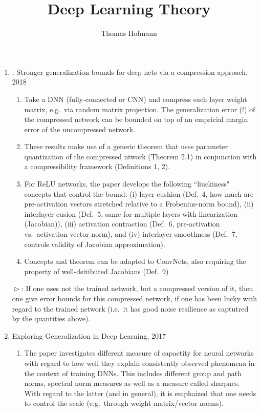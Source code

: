\documentclass[10pt,a4paper]{article}
\author{Thomas Hofmann}
\title{Deep Learning Theory}
\renewcommand{\th}{$\vartriangleright$}
\begin{document}
\maketitle

\begin{enumerate}
\item \cite{arora2018stronger}: Stronger generalization bounds for deep nets via a compression approach, 2018
\begin{enumerate}
\item Take a DNN (fully-connected or CNN) and compress each layer weight matrix, e.g.~via random matrix projection. The generalization error (!) of the compressed network can be bounded on top of an empricial margin error of the uncompressed network. 
\item These results make use of a generic theorem that uses parameter quantization of the compressed ntwork (Theorem 2.1) in conjunction with a compressibility framework (Definitions 1, 2). 
\item For ReLU networks, the paper develops the following ``liuckiness" concepts that control the bound: (i) layer cushion (Def.~4, how much are pre-activation vectors stretched relative to a Frobenius-norm bound), (ii) interlayer cusion (Def.~5, same for multiple layers with linearization (Jacobian)), (iii) activation contraction (Def.~6, pre-activation vs.~activation vector norm), and (iv) interlayer smoothness (Def.~7, controls validity of Jacobian approximation). 
\item Concepts and theorem can be adapted to ConvNets, also requiring the property of well-dsitibuted Jacobians (Def.~9) 
\end{enumerate}
\th: If one uses not the trained network, but a compressed version of it, then one give error bounds for this compressed network, if one has been lucky with regard to the trained network (i.e.~it has good noise resilience as captutred by the quantities above).
\item \cite{neyshabur2017exploring}  Exploring Generalization in Deep Learning, 2017
\begin{enumerate}
\item The paper investigates different measure of capactity for neural networks with regard to how well they explain consistently observed phenomena in the context of training DNNs. This includes different group and path norms,  spectral norm measures as well as a measure called sharpnes. With regard to the latter (and in general), it is emphaized that one needs to control the scale (e.g.~through weight matrix/vector norms).

\end{enumerate}
\end{enumerate}
\end{document}
